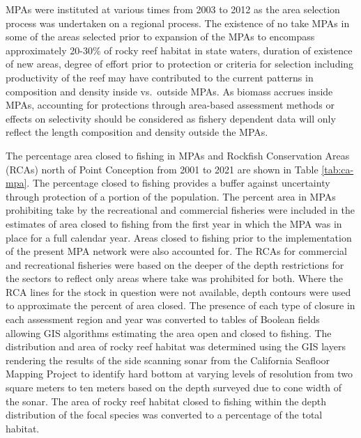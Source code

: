 \documentclass[11pt,
  english,
  a4paper,
]{article}
\begin{document}

MPAs were instituted at various times from 2003 to 2012 as the area selection process was undertaken on a regional process. The existence of no take MPAs in some of the areas selected prior to expansion of the MPAs to encompass approximately 20-30\% of rocky reef habitat in state waters, duration of existence of new areas, degree of effort prior to protection or criteria for selection including productivity of the reef may have contributed to the current patterns in composition and density inside vs.~outside MPAs. As biomass accrues inside MPAs, accounting for protections through area-based assessment methods or effects on selectivity should be considered as fishery dependent data will only reflect the length composition and density outside the MPAs.

\leavevmode\tagmcend\tagstructend\par


The percentage area closed to fishing in MPAs and Rockfish Conservation Areas (RCAs) north of Point Conception from 2001 to 2021 are shown in Table \ref{tab:ca-mpa}. The percentage closed to fishing provides a buffer against uncertainty through protection of a portion of the population. The percent area in MPAs prohibiting take by the recreational and commercial fisheries were included in the estimates of area closed to fishing from the first year in which the MPA was in place for a full calendar year. Areas closed to fishing prior to the implementation of the present MPA network were also accounted for. The RCAs for commercial and recreational fisheries were based on the deeper of the depth restrictions for the sectors to reflect only areas where take was prohibited for both. Where the RCA lines for the stock in question were not available, depth contours were used to approximate the percent of area closed. The presence of each type of closure in each assessment region and year was converted to tables of Boolean fields allowing GIS algorithms estimating the area open and closed to fishing. The distribution and area of rocky reef habitat was determined using the GIS layers rendering the results of the side scanning sonar from the California Seafloor Mapping Project to identify hard bottom at varying levels of resolution from two square meters to ten meters based on the depth surveyed due to cone width of the sonar. The area of rocky reef habitat closed to fishing within the depth distribution of the focal species was converted to a percentage of the total habitat.
\end{document}
